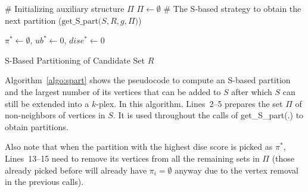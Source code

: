 \documentclass[sigconf, nonacm]{acmart}
\begin{document}
\begin{algorithm}[!t]
  \DontPrintSemicolon
  \# Initializing auxiliary structure $\Pi$\;
  $\Pi\gets\emptyset$\;
  \# The S-based strategy to obtain the next partition \;
  \Begin($\text{get\_S\_part}{(}S, R, g, \Pi{)}$){
    $\pi^*\gets\emptyset$, $ub^*\gets 0$, $dise^*\gets 0$\;
        
      \;
  }
\caption{S-Based Partitioning of Candidate Set $R$}    
\label{algo:spart}
\end{algorithm}

Algorithm~\ref{algo:spart} shows the pseudocode to compute an S-based partition and the largest number of its vertices that can be added to $S$ after which $S$ can still be extended into a $k$-plex. In this algorithm. Lines~2--5 prepares the set $\Pi$ of non-neighbors of vertices in $S$. It is used throughout the calls of get\_S\_part(.) to obtain partitions.

Also note that when the partition with the highest dise score is picked as $\pi^*$, Lines~13--15 need to remove its vertices from all the remaining sets in $\Pi$ (those already picked before will already have $\pi_i=\emptyset$ anyway due to the vertex removal in the previous calls).
\end{document}
